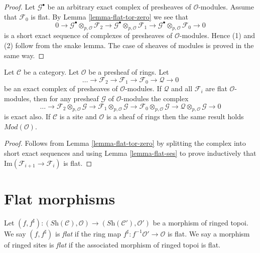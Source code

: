 \begin{proof}
Let $\mathcal{G}^\bullet$ be an arbitrary exact complex of presheaves
of $\mathcal{O}$-modules. Assume that $\mathcal{F}_0$ is flat.
By Lemma \ref{lemma-flat-tor-zero} we see that
$$
0 \to
\mathcal{G}^\bullet \otimes_{p, \mathcal{O}} \mathcal{F}_2 \to
\mathcal{G}^\bullet \otimes_{p, \mathcal{O}} \mathcal{F}_1 \to
\mathcal{G}^\bullet \otimes_{p, \mathcal{O}} \mathcal{F}_0 \to 0
$$
is a short exact sequence of complexes of presheaves of
$\mathcal{O}$-modules. Hence (1) and (2) follow from the snake lemma.
The case of sheaves of modules is proved in the same way.
\end{proof}

\begin{lemma}
\label{lemma-flat-resolution-of-flat}
Let $\mathcal{C}$ be a category.
Let $\mathcal{O}$ be a presheaf of rings.
Let
$$
\ldots \to
\mathcal{F}_2 \to
\mathcal{F}_1 \to
\mathcal{F}_0 \to
\mathcal{Q} \to 0
$$
be an exact complex of presheaves of $\mathcal{O}$-modules.
If $\mathcal{Q}$ and all $\mathcal{F}_i$ are flat $\mathcal{O}$-modules,
then for any presheaf $\mathcal{G}$ of $\mathcal{O}$-modules the
complex
$$
\ldots \to
\mathcal{F}_2 \otimes_{p, \mathcal{O}} \mathcal{G} \to
\mathcal{F}_1 \otimes_{p, \mathcal{O}} \mathcal{G} \to
\mathcal{F}_0 \otimes_{p, \mathcal{O}} \mathcal{G} \to
\mathcal{Q} \otimes_{p, \mathcal{O}} \mathcal{G} \to 0
$$
is exact also. If $\mathcal{C}$ is a site and $\mathcal{O}$ is a
sheaf of rings then the same result holds $\textit{Mod}(\mathcal{O})$.
\end{lemma}

\begin{proof}
Follows from Lemma \ref{lemma-flat-tor-zero} by splitting the complex
into short exact sequences and using Lemma \ref{lemma-flat-ses} to
prove inductively that $\text{Im}(\mathcal{F}_{i + 1} \to \mathcal{F}_i)$
is flat.
\end{proof}





\section{Flat morphisms}
\label{section-flat-morphisms}

\begin{definition}
\label{definition-flat-morphism}
Let 
$(f, f^\sharp) :
(\textit{Sh}(\mathcal{C}), \mathcal{O})
\longrightarrow
(\textit{Sh}(\mathcal{C}'), \mathcal{O}')$
be a morphism of ringed topoi. We say $(f, f^\sharp)$ is
{\it flat} if the ring map $f^\sharp : f^{-1}\mathcal{O}' \to \mathcal{O}$
is flat. We say a morphism of ringed sites is {\it flat}
if the associated morphism of ringed topoi is flat.
\end{definition}

